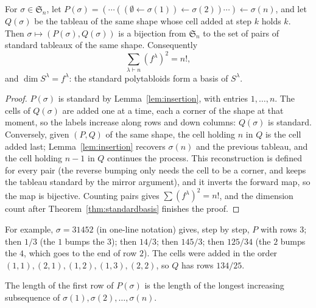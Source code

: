 \begin{theorem}\label{thm:rs}
For $\sigma\in\mathfrak S_n$, let $P(\sigma)=(\cdots((\emptyset\leftarrow\sigma(1))\leftarrow\sigma(2))\cdots)\leftarrow\sigma(n)$, and let $Q(\sigma)$ be the tableau of the same shape whose cell added at step $k$ holds $k$. Then
$\sigma\mapsto(P(\sigma),Q(\sigma))$ is a bijection from $\mathfrak S_n$ to the set of pairs of standard tableaux of the same shape. Consequently
\[
\sum_{\lambda\vdash n}(f^\lambda)^2=n!,
\]
and $\dim S^\lambda=f^\lambda$: the standard polytabloids form a basis of $S^\lambda$.
\end{theorem}

\begin{proof}
$P(\sigma)$ is standard by Lemma~\ref{lem:insertion}, with entries $1,\dots,n$. The cells of $Q(\sigma)$ are added one at a time, each a corner of the shape at that moment, so the labels increase along rows and down columns: $Q(\sigma)$
is standard. Conversely, given $(P,Q)$ of the same shape, the cell holding $n$ in $Q$ is the cell added last; Lemma~\ref{lem:insertion} recovers $\sigma(n)$ and the previous tableau, and the cell holding $n-1$ in $Q$ continues the process.
This reconstruction is defined for every pair (the reverse bumping only needs the cell to be a corner, and keeps the tableau standard by the mirror argument), and it inverts the forward map, so the map is bijective. Counting
pairs gives $\sum(f^\lambda)^2=n!$, and the dimension count after Theorem~\ref{thm:standardbasis} finishes the proof.
\end{proof}

For example, $\sigma=31452$ (in one-line notation) gives, step by step, $P$ with rows $3$; then $1/3$ (the $1$ bumps the $3$); then $14/3$; then $145/3$; then $125/34$ (the $2$ bumps the $4$, which goes to the end of row $2$). The cells were
added in the order $(1,1),(2,1),(1,2),(1,3),(2,2)$, so $Q$ has rows $134/25$.

\begin{theorem}[Schensted, 1961]\label{thm:schensted}
The length of the first row of $P(\sigma)$ is the length of the longest increasing subsequence of $\sigma(1),\sigma(2),\dots,\sigma(n)$.
\end{theorem}

